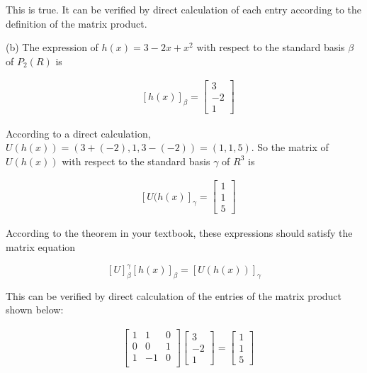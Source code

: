 \documentclass[12pt]{amsart}
\begin{document}
This is true.  It can be verified by direct calculation of each entry according to the definition of the matrix product.

\vspace{1pc}


(b)  The expression of $h(x)=3-2x+x^2$ with respect to the standard basis $\beta$ of $P_2(R)$ is

\begin{align*}
& [h(x)]_\beta = \begin{bmatrix} 3 \\ -2 \\ 1 \end{bmatrix}
\end{align*}

According to a direct calculation, $U(h(x)) = (3+(-2),1,3-(-2)) = (1,1,5)$.  So the matrix of $U(h(x))$ with respect to the standard basis $\gamma$ of $R^3$ is

\begin{align*}
& [U(h(x)]_\gamma = \begin{bmatrix} 1 \\ 1 \\ 5 \end{bmatrix}
\end{align*}

According to the theorem in your textbook, these expressions should satisfy the matrix equation

\[[U]_{\beta}^{\gamma}[h(x)]_{\beta} = [U(h(x))]_{\gamma}\]

This can be verified by direct calculation of the entries of the matrix product shown below:

\begin{align*}
& \begin{bmatrix}
1 & 1 & 0\\
0 & 0 & 1\\
1 & -1 & 0\\ \end{bmatrix} \begin{bmatrix} 3 \\ -2 \\ 1 \end{bmatrix} = \begin{bmatrix} 1 \\ 1 \\ 5 \end{bmatrix}\\
\end{align*}
\end{document}
